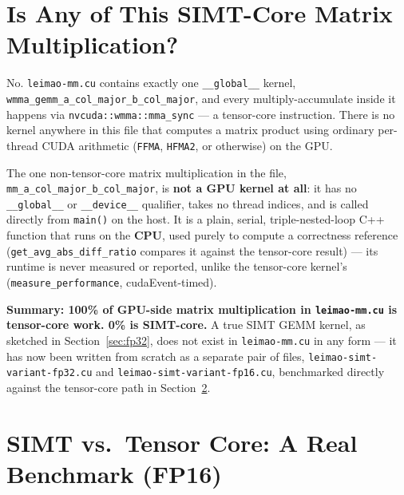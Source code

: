 \documentclass[11pt]{article}
\begin{document}
\section{Is Any of This SIMT-Core Matrix Multiplication?}
\label{sec:simt}

No. \texttt{leimao-mm.cu} contains exactly one \texttt{\_\_global\_\_} kernel,
\texttt{wmma\_gemm\_a\_col\_major\_b\_col\_major}, and every multiply-accumulate inside
it happens via \texttt{nvcuda::wmma::mma\_sync} --- a tensor-core instruction. There is no
kernel anywhere in this file that computes a matrix product using ordinary per-thread CUDA
arithmetic (\texttt{FFMA}, \texttt{HFMA2}, or otherwise) on the GPU.

The one non-tensor-core matrix multiplication in the file,
\texttt{mm\_a\_col\_major\_b\_col\_major}, is \textbf{not a GPU kernel at all}: it has no
\texttt{\_\_global\_\_} or \texttt{\_\_device\_\_} qualifier, takes no thread indices, and
is called directly from \texttt{main()} on the host. It is a plain, serial,
triple-nested-loop C++ function that runs on the \textbf{CPU}, used purely to compute a
correctness reference (\texttt{get\_avg\_abs\_diff\_ratio} compares it against the
tensor-core result) --- its runtime is never measured or reported, unlike the tensor-core
kernel's (\texttt{measure\_performance}, cudaEvent-timed).

\textbf{Summary: 100\% of GPU-side matrix multiplication in \texttt{leimao-mm.cu} is
tensor-core work. 0\% is SIMT-core.} A true SIMT GEMM kernel, as sketched in
Section~\ref{sec:fp32}, does not exist in \texttt{leimao-mm.cu} in any form --- it has
now been written from scratch as a separate pair of files,
\texttt{leimao-simt-variant-fp32.cu} and \texttt{leimao-simt-variant-fp16.cu}, benchmarked
directly against the tensor-core path in Section~\ref{sec:benchmark}.

\section{SIMT vs.\ Tensor Core: A Real Benchmark (FP16)}
\label{sec:benchmark}
\end{document}
